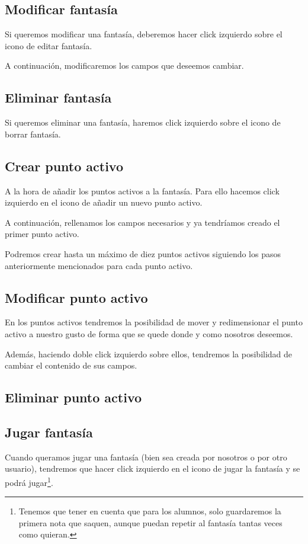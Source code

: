 \documentclass{book}
\begin{document}
\subsection{Modificar fantasía}
Si queremos modificar una fantasía, deberemos hacer click izquierdo sobre el icono de editar fantasía.



A continuación, modificaremos los campos que deseemos cambiar.



\subsection{Eliminar fantasía}
Si queremos eliminar una fantasía, haremos click izquierdo sobre el icono de borrar fantasía.


\subsection{Crear punto activo}
A la hora de añadir los puntos activos a la fantasía. Para ello hacemos click izquierdo en el icono de añadir un nuevo punto activo.



A continuación, rellenamos los campos necesarios y ya tendríamos creado el primer punto activo.


Podremos crear hasta un máximo de diez puntos activos siguiendo los pasos anteriormente mencionados para cada punto activo.


\subsection{Modificar punto activo}
En los puntos activos tendremos la posibilidad de mover y redimensionar el punto activo a nuestro gusto de forma que se quede donde y como nosotros deseemos.

Además, haciendo doble click izquierdo sobre ellos, tendremos la posibilidad de cambiar el contenido de sus campos.

\subsection{Eliminar punto activo}

\subsection{Jugar fantasía}
Cuando queramos jugar una fantasía (bien sea creada por nosotros o por otro usuario), tendremos que hacer click izquierdo en el icono de jugar la fantasía y se podrá jugar\footnote{Tenemos que tener en cuenta que para los alumnos, solo guardaremos la primera nota que saquen, aunque puedan repetir al fantasía tantas veces como quieran.}.



	
\end{document}
